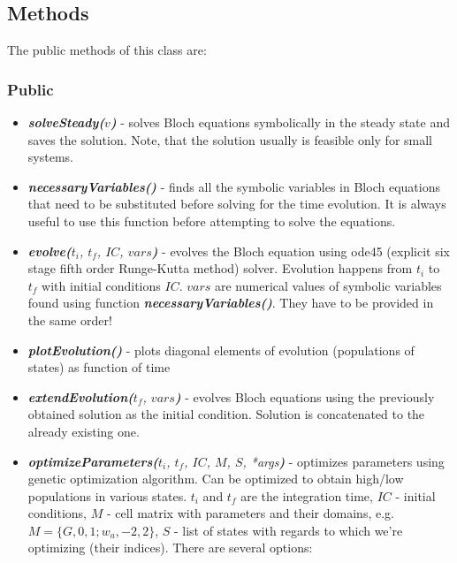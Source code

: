 \documentclass{article}
\numberwithin{equation}{section}
\numberwithin{figure}{section}
\numberwithin{table}{section}
\newcommand\codefun[2]{\textit{\textbf{#1(}#2\textbf{)}}}
\newcommand\codevar[1]{\ttfamily #1\rmfamily}
\begin{document}
\subsection*{Methods}

The public methods of this class are:

\subsubsection*{Public}

\begin{itemize}
\item \codefun{solveSteady}{$v$} - solves Bloch equations symbolically in the steady state and saves the solution. Note, that the solution usually is feasible only for small systems.

\item \codefun{necessaryVariables}{} - finds all the symbolic variables in Bloch equations that need to be substituted before solving for the time evolution. It is always useful to use this function before attempting to solve the equations.

\item \codefun{evolve}{$t_i$, $t_f$, $IC$, $vars$} - evolves the Bloch equation using ode45 (explicit  six stage fifth order Runge-Kutta method) solver. Evolution happens from $t_i$ to $t_f$ with initial conditions $IC$. $vars$ are numerical values of symbolic variables found using function \codefun{necessaryVariables}{}. They have to be provided in the same order!

\item \codefun{plotEvolution}{} - plots diagonal elements of \codevar{evolution} (populations of states) as function of time

\item \codefun{extendEvolution}{$t_f$, $vars$} - evolves Bloch equations using the previously obtained solution as the initial condition. Solution is concatenated to the already existing one.

\item \codefun{optimizeParameters}{$t_i$, $t_f$, $IC$, $M$, $S$, *args} - optimizes parameters using genetic optimization algorithm. Can be optimized to obtain high/low populations in
various states. $t_i$ and $t_f$ are the integration time, $IC$ - initial conditions, $M$ - cell matrix with parameters and their domains, e.g. $M=\{G,0,1;w_a,-2,2\}$, $S$ - list of states with regards to which we're optimizing (their indices).
\newline
\noindent There are several options:


\end{itemize}
\end{document}
